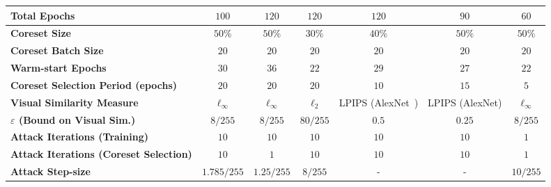 \documentclass[runningheads]{llncs}
\begin{document}
\begin{sidewaystable}[htp]
\begin{center}
\begin{scriptsize}
\begin{tabular}{lcccccc}
				\textbf{Total Epochs}                       & $100$                            & $120$                           & $120$                      & $120$                     & $90$      & $60$\\
				\midrule
				\textbf{Coreset Size}                       & $50$\%                           & $50$\%                          & $30$\%                     & $40$\%                     & $50$\%   & $50$\%\\
				\textbf{Coreset Batch Size}                 & $20$                             & $20$                            & $20$                       & $20$                       & $20$     & $20$\\
				\textbf{Warm-start Epochs}                  & $30$                             & $36$                            & $22$                       & $29$                       & $27$     & $22$\\
				\textbf{Coreset Selection Period (epochs)}  & $20$                             & $20$                            & $20$                       & $10$                       & $15$     & $5$\\
				\midrule
				\textbf{Visual Similarity Measure}            & $\ell_\infty$                  & $\ell_\infty$                   & $\ell_2$                   & LPIPS (AlexNet~\cite{krizhevsky2012alexnet}) & LPIPS (AlexNet) & $\ell_\infty$\\
				\textbf{$\varepsilon$ (Bound on Visual Sim.)} & $8/255$                        & $8/255$                         & $80/255$                   & $0.5$                      & $0.25$   & $8/255$\\
				\textbf{Attack Iterations (Training)}         & $10$                           & $10$                            & $10$                       & $10$                       & $10$     & $1$\\
				\textbf{Attack Iterations (Coreset Selection)}& $10$                           & $1$                             & $10$                       & $10$                       & $10$     & $1$\\
				\textbf{Attack Step-size}                     & $1.785/255$                     & $1.25/255$                      & $8/255$                    & -                          & -        & $10/255$\\      
				\bottomrule
			\end{tabular}
		\end{scriptsize}
	\end{center}
\end{sidewaystable}
\end{document}
